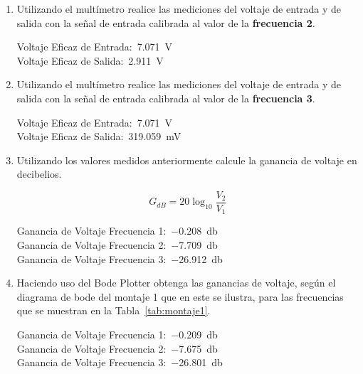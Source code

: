 \documentclass[12pt,a4paper]{article}
\begin{document}
\begin{enumerate}
    \begin{flushright}
        Voltaje Eficaz de Entrada:~\SI{7.071}{\volt}\\
        Voltaje Eficaz de Salida:~\SI{6.904}{\volt}
    \end{flushright}

    \item Utilizando el multímetro realice las mediciones del voltaje de entrada y de salida con la señal de entrada calibrada al valor de la \textbf{frecuencia 2}.
    
    \begin{flushright}
        Voltaje Eficaz de Entrada:~\SI{7.071}{\volt}\\
        Voltaje Eficaz de Salida:~\SI{2.911}{\volt}
    \end{flushright}

    \item Utilizando el multímetro realice las mediciones del voltaje de entrada y de salida con la señal de entrada calibrada al valor de la \textbf{frecuencia 3}.
    
    \begin{flushright}
        Voltaje Eficaz de Entrada:~\SI{7.071}{\volt}\\
        Voltaje Eficaz de Salida:~\SI{319.059}{\milli\volt}
    \end{flushright}

    \item Utilizando los valores medidos anteriormente calcule la ganancia de voltaje en decibelios.
    
    \[
        G_{dB} = 20\log_{10}\frac{V_2}{V_1}
    \]

    \begin{flushright}
        Ganancia de Voltaje Frecuencia 1:~\SI{-0.208}{\decibel}\\
        Ganancia de Voltaje Frecuencia 2:~\SI{-7.709}{\decibel}\\
        Ganancia de Voltaje Frecuencia 3:~\SI{-26.912}{\decibel}
    \end{flushright}

    \item Haciendo uso del Bode Plotter obtenga las ganancias de voltaje, según el diagrama de bode del montaje 1 que en este se ilustra, para las frecuencias que se muestran en la Tabla~\ref{tab:montaje1}.
    
    \begin{flushright}
        Ganancia de Voltaje Frecuencia 1:~\SI{-0.209}{\decibel}\\
        Ganancia de Voltaje Frecuencia 2:~\SI{-7.675}{\decibel}\\
        Ganancia de Voltaje Frecuencia 3:~\SI{-26.801}{\decibel}
    \end{flushright}
\end{enumerate}
\end{document}
